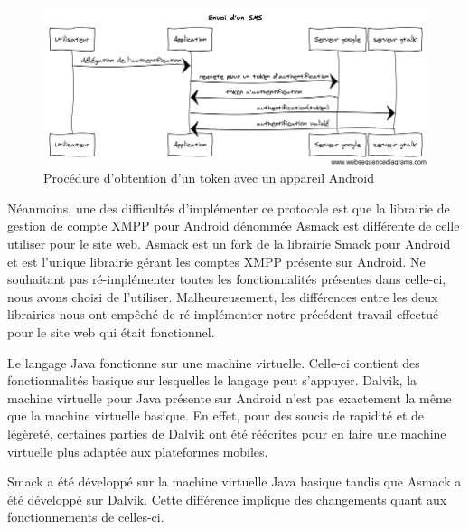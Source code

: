  

\begin{figure}[!h]
  \center
  \includegraphics[width=15cm]{img/obtention-token-avec-android.png}
  \caption{Procédure d'obtention d'un token avec un appareil Android}
  \label{obtention-token-avec-android}
\end{figure}

Néanmoins, une des difficultés d'implémenter ce protocole est que la librairie de gestion de compte
XMPP pour Android dénommée Asmack est différente de celle utiliser pour le site web. Asmack est un fork 
de la librairie Smack pour Android et est l'unique librairie gérant les comptes XMPP présente sur
Android. Ne souhaitant pas ré-implémenter toutes les fonctionnalités présentes dans celle-ci, nous avons
choisi de l'utiliser. Malheureusement, les différences entre les deux librairies nous ont empêché de 
ré-implémenter notre précédent travail effectué pour le site web qui était fonctionnel. 

Le langage Java fonctionne sur une machine virtuelle. Celle-ci contient des fonctionnalités basique sur
lesquelles le langage peut s'appuyer. Dalvik, la machine virtuelle pour Java présente sur Android n'est 
pas exactement la même que la machine virtuelle basique. En effet, pour des soucis de rapidité et de 
légèreté, certaines parties de Dalvik ont été réécrites pour en faire une machine virtuelle plus adaptée
aux plateformes mobiles.

Smack a été développé sur la machine virtuelle Java basique tandis que Asmack a été développé sur Dalvik.
Cette différence implique des changements quant aux fonctionnements de celles-ci.

